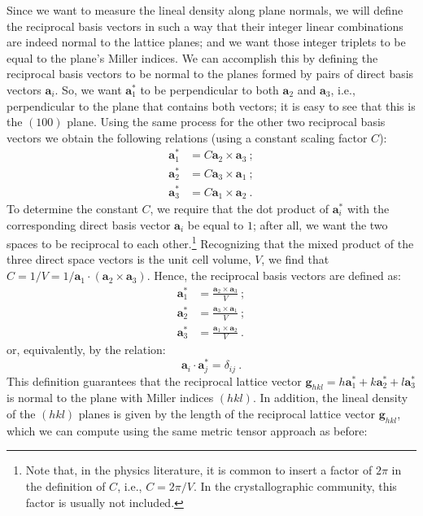 Since we want to measure the lineal density along plane normals, we will define the reciprocal basis vectors in such a way that their integer linear combinations are indeed normal to the lattice planes; and we want those integer triplets to be equal to the plane's Miller indices.  We can accomplish this by defining the reciprocal basis vectors to be normal to the planes formed by pairs of direct basis vectors $\mathbf{a}_i$.  So, we want $\mathbf{a}^{\ast}_1$ to be perpendicular to both $\mathbf{a}_2$ and $\mathbf{a}_3$, i.e., perpendicular to the plane that contains both vectors; it is easy to see that this is the $(100)$ plane.  Using the same process for the other two reciprocal basis vectors we obtain the following relations (using a constant scaling factor $C$):
\begin{align*}
	\mathbf{a}^{\ast}_1 &= C \mathbf{a}_2\times\mathbf{a}_3 \ ;\\
	\mathbf{a}^{\ast}_2 &= C \mathbf{a}_3\times\mathbf{a}_1 \ ;\\
	\mathbf{a}^{\ast}_3 &= C \mathbf{a}_1\times\mathbf{a}_2 \ .	
\end{align*}
To determine the constant $C$, we require that the dot product of $\mathbf{a}_i^{\ast}$ with the corresponding direct basis vector $\mathbf{a}_i$ be equal to $1$; after all, we want the two spaces to be reciprocal to each other.\footnote{Note that, in the physics literature, it is common to insert a factor of $2\pi$ in the definition of $C$, i.e., $C=2\pi/V$.  In the crystallographic community, this factor is usually not included.} Recognizing that the mixed product of the three direct space vectors is the unit cell volume, $V$, we find that $C=1/V=1/\mathbf{a}_1\cdot(\mathbf{a}_2\times\mathbf{a}_3)$.  Hence, the reciprocal basis vectors are defined as:
\begin{align}
	\mathbf{a}^{\ast}_1 &= \frac{\mathbf{a}_2\times\mathbf{a}_3}{V} \ ;\nonumber\\
	\mathbf{a}^{\ast}_2 &= \frac{\mathbf{a}_3\times\mathbf{a}_1}{V} \ ;\label{\chabbr:eq:stardef}\\
	\mathbf{a}^{\ast}_3 &= \frac{\mathbf{a}_1\times\mathbf{a}_2}{V} \ .\nonumber	
\end{align}
or, equivalently, by the relation:
\begin{equation}
	\mathbf{a}_i\cdot\mathbf{a}^{\ast}_j = \delta_{ij} \ .\label{\chabbr:eq:rldef}
\end{equation}
This definition guarantees that the reciprocal lattice vector $\mathbf{g}_{hkl}=h\mathbf{a}_1^{\ast}+k\mathbf{a}_2^{\ast}+l\mathbf{a}_3^{\ast}$ is normal to the plane with Miller indices $(hkl)$.  In addition, the lineal density of the $(hkl)$ planes is given by the length of the reciprocal lattice vector $\mathbf{g}_{hkl}$, which we can compute using the same metric tensor approach as before:
